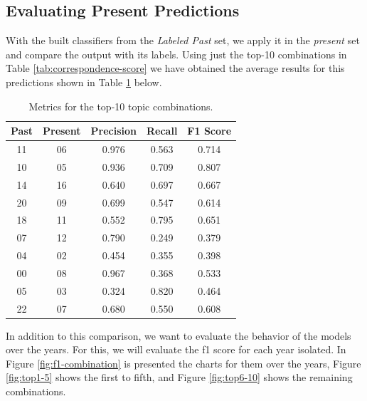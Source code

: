 \subsection{Evaluating Present Predictions}

With the built classifiers from the \textit{Labeled Past} set, we apply it in the \textit{present} set and compare the output with its labels. Using just the top-10 combinations in Table \ref{tab:correspondence-score} we have obtained the average results for this predictions shown in Table \ref{tab:avg-combination-score} below.

\begin{table}[h!]
	\centering
	\caption{Metrics for the top-10 topic combinations.}
	\label{tab:avg-combination-score}
	\begin{tabular}{cc|ccc}
		\toprule
		\textbf{Past} & \textbf{Present} & \textbf{Precision} & \textbf{Recall} & \textbf{F1 Score} \\ \midrule
		11 & 06 & 0.976 & 0.563 & 0.714 \\
		10 & 05 & 0.936 & 0.709 & 0.807 \\
		14 & 16 & 0.640 & 0.697 & 0.667 \\
		20 & 09 & 0.699 & 0.547 & 0.614 \\
		18 & 11 & 0.552 & 0.795 & 0.651 \\
		07 & 12 & 0.790 & 0.249 & 0.379 \\
		04 & 02 & 0.454 & 0.355 & 0.398 \\
		00 & 08 & 0.967 & 0.368 & 0.533 \\
		05 & 03 & 0.324 & 0.820 & 0.464 \\
		22 & 07 & 0.680 & 0.550 & 0.608 \\
		\bottomrule
	\end{tabular}
\end{table}

In addition to this comparison, we want to evaluate the behavior of the models over the years. For this, we will evaluate the f1 score for each year isolated. In Figure \ref{fig:f1-combination} is presented the charts for them over the years, Figure \ref{fig:top1-5} shows the first to fifth, and Figure \ref{fig:top6-10} shows the remaining combinations.

